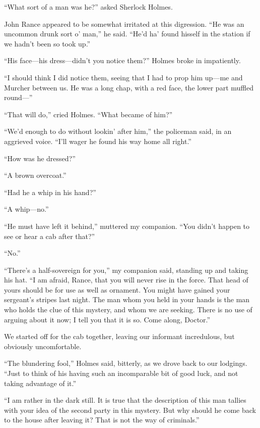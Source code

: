 \documentclass[12pt,english,oneside]{book}
\newcommand{\mdsh}[1]{\mbox{#1}\linebreak[1]}
\begin{document}
{}``What sort of a man was he?'' asked Sherlock Holmes.

John Rance appeared to be somewhat irritated at this digression. {}``He
was an uncommon drunk sort o' man,'' he said. {}``He'd ha' found
hisself in the station if we hadn't been so took up.''

{}``His face\mdsh{---}his dress\mdsh{---}didn't you notice them?''
Holmes broke in impatiently.

{}``I should think I did notice them, seeing that I had to prop him
up\mdsh{---}me and Murcher between us. He was a long chap, with a
red face, the lower part muffled round\mdsh{---}''

{}``That will do,'' cried Holmes. {}``What became of him?''

{}``We'd enough to do without lookin' after him,'' the policeman
said, in an aggrieved voice. {}``I'll wager he found his way home
all right.''

{}``How was he dressed?''

{}``A brown overcoat.''

{}``Had he a whip in his hand?''

{}``A whip\mdsh{---}no.''

{}``He must have left it behind,'' muttered my companion. {}``You
didn't happen to see or hear a cab after that?''

{}``No.''

{}``There's a half-sovereign for you,'' my companion said, standing
up and taking his hat. {}``I am afraid, Rance, that you will never
rise in the force. That head of yours should be for use as well as
ornament. You might have gained your sergeant's stripes last night.
The man whom you held in your hands is the man who holds the clue
of this mystery, and whom we are seeking. There is no use of arguing
about it now; I tell you that it is so. Come along, Doctor.''

We started off for the cab together, leaving our informant incredulous,
but obviously uncomfortable.

{}``The blundering fool,'' Holmes said, bitterly, as we drove back
to our lodgings. {}``Just to think of his having such an incomparable
bit of good luck, and not taking advantage of it.''

{}``I am rather in the dark still. It is true that the description
of this man tallies with your idea of the second party in this mystery.
But why should he come back to the house after leaving it? That is
not the way of criminals.''
\end{document}
